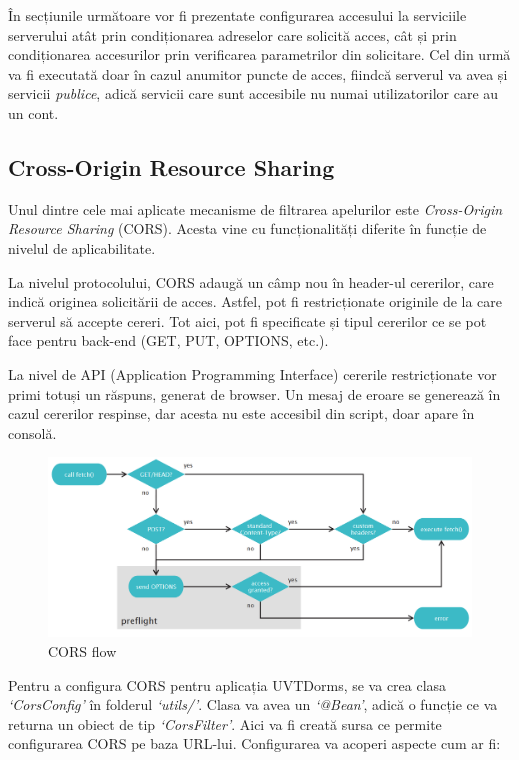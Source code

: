\documentclass[12pt,a4paper]{report}
\theoremstyle{definition}
\theoremstyle{remark}
\begin{document}
\par În secțiunile următoare vor fi prezentate configurarea accesului la serviciile serverului atât prin condiționarea adreselor care solicită acces, cât și prin condiționarea accesurilor prin verificarea parametrilor din solicitare. Cel din urmă va fi executată doar în cazul anumitor puncte de acces, fiindcă serverul va avea și servicii \textit{publice}, adică servicii care sunt accesibile nu numai utilizatorilor care au un cont.

\subsection{Cross-Origin Resource Sharing}
\par Unul dintre cele mai aplicate mecanisme de filtrarea apelurilor este \textit{Cross-Origin Resource Sharing}\cite{gibbinscross} (CORS). Acesta vine cu funcționalități diferite în funcție de nivelul de aplicabilitate.

\par La nivelul protocolului, CORS adaugă un câmp nou în header-ul cererilor, care indică originea solicitării de acces. Astfel, pot fi restricționate originile de la care serverul să accepte cereri. Tot aici, pot fi specificate și tipul cererilor ce se pot face pentru back-end (GET, PUT, OPTIONS, etc.).

\par La nivel de API (Application Programming Interface) cererile restricționate vor primi totuși un răspuns, generat de browser. Un mesaj de eroare se generează în cazul cererilor respinse, dar acesta nu este accesibil din script, doar apare în consolă.

\begin{figure}[H]
    \centering
    \includegraphics[width=1\linewidth]{resurse/diagrame/diagrama_cors.png}
    \caption{CORS flow\cite{gibbinscross}}
\end{figure}

\par Pentru a configura CORS pentru aplicația UVTDorms, se va crea clasa \textit{`CorsConfig'} în folderul \textit{`utils/'}. Clasa va avea un \textit{`@Bean'}, adică o funcție ce va returna un obiect de tip \textit{`CorsFilter'}. Aici va fi creată sursa ce permite configurarea CORS pe baza URL-lui. Configurarea va acoperi aspecte cum ar fi:
\end{document}
